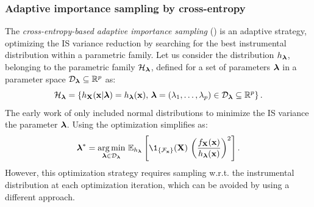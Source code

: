 \subsubsection{Adaptive importance sampling by cross-entropy}

The \textit{cross-entropy-based adaptive importance sampling} () is an adaptive strategy, optimizing the IS variance reduction by searching for the best instrumental distribution within a parametric family. 
Let us consider the distribution $h_{{\boldsymbol{\lambda}}}$, belonging to the parametric family $\mathcal{H}_{\boldsymbol{\lambda}}$, defined for a set of parameters ${\boldsymbol{\lambda}}$ in a parameter space $\mathcal{D}_{{\boldsymbol{\lambda}}} \subseteq \mathbb{R}^p$ as: 
\begin{equation}
    \mathcal{H}_{\boldsymbol{\lambda}} = \left\{h_{\bf X}({\bf x} | {\boldsymbol{\lambda}}) = h_{{\boldsymbol{\lambda}}}({\bf x}), \, {\boldsymbol{\lambda}} = (\lambda_1, \dots, \lambda_p) \in \mathcal{D}_{\boldsymbol{\lambda}} \subseteq \mathbb{R}^p\right\}.
\end{equation} 
The early work of \citet{bucher_1988_AIS} only included normal distributions to minimize the IS variance  the parameter ${\boldsymbol{\lambda}}$.
Using  the optimization simplifies as:
\begin{equation}
    \blambda^* = \argmin_{\blambda \in \iD_\blambda} \, \E_{h_\blambda}\left[ \1_{\{\iF_\bx\}}(\bX) \, \left(\frac{f_\bX(\bx)}{h_\blambda(\bx)}\right)^2 \right]. 
\end{equation}
However, this optimization strategy requires sampling w.r.t. the instrumental distribution at each optimization iteration, which can be avoided by using a different approach. 

